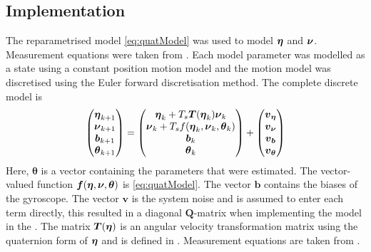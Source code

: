 \subsection{Implementation}\label{sec:KalmanEstimatorImpl}
The reparametrised model \eqref{eq:quatModel} was used to model $\boldsymbol{\eta}$ and $\boldsymbol{\nu}$. Measurement equations were taken from . Each model parameter was modelled as a state using a constant position motion model and the motion model was discretised using the Euler forward discretisation method. The complete discrete model is
\begin{equation}
\label{eq:motionModelKalman}
\begin{pmatrix}
\boldsymbol{\eta}_{k+1}\\ 
\boldsymbol{\nu}_{k+1}\\
\boldsymbol{b}_{k+1}\\
\boldsymbol{\theta}_{k+1}
\end{pmatrix} = 
\begin{pmatrix}
\boldsymbol{\eta}_k + T_s \boldsymbol{T}(\boldsymbol{\eta}_k)\boldsymbol{\nu}_k\\
\boldsymbol{\nu}_k + T_s f(\boldsymbol{\eta}_k,\boldsymbol{\nu}_k,\boldsymbol{\theta}_k)\\
\boldsymbol{b}_k\\
\boldsymbol{\theta}_k
\end{pmatrix}
+ \begin{pmatrix}
\boldsymbol{v}_{\boldsymbol{\eta}}\\
\boldsymbol{v}_{\boldsymbol{\nu}}\\
\boldsymbol{v}_{\boldsymbol{b}}\\
\boldsymbol{v}_{\boldsymbol{\theta}}
\end{pmatrix}
\end{equation}
Here, $\boldsymbol{\theta}$ is a vector containing the parameters that were estimated. The vector-valued function $\boldsymbol{f}(\boldsymbol{\eta},\boldsymbol{\nu},\boldsymbol{\theta})$ is \eqref{eq:quatModel}. The vector $\boldsymbol{b}$  contains the biases of the gyroscope. The vector $\boldsymbol{v}$ is the system noise and is assumed to enter each term directly, this resulted in a diagonal $\boldsymbol{Q}$-matrix when implementing the model in the \abbrEKF. The matrix $\boldsymbol{T}(\boldsymbol{\eta})$ is an angular velocity transformation matrix using the quaternion form of $\boldsymbol{\eta}$ and is defined in . Measurement equations are taken from .


